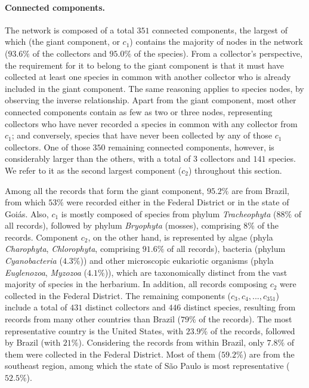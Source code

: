 \paragraph{Connected components.}
The network is composed of a total $351$ connected components, the largest of which (the giant component, or $c_1$) contains the majority of nodes in the network ($93.6\%$ of the collectors and $95.0\%$ of the species). 
From a collector's perspective, the requirement for it to belong to the giant component is that it must have collected at least one species in common with another collector who is already included in the giant component. The same reasoning applies to species nodes, by observing the inverse relationship.
Apart from the giant component, most other connected components contain as few as two or three nodes, representing collectors who have never recorded a species in common with any collector from $c_1$; and conversely, species that have never been collected by any of those $c_1$ collectors.
One of those $350$ remaining connected components, however, is considerably larger than the others, with a total of $3$ collectors and $141$ species. We refer to it as the second largest component ($c_2$) throughout this section.

Among all the records that form the giant component, $95.2\%$ are from Brazil, from which $53\%$ were recorded either in the Federal District or in the state of Goiás. 
Also, $c_1$ is mostly composed of species from phylum \textit{Tracheophyta} ($88\%$ of all records), followed by phylum \textit{Bryophyta} (mosses), comprising $8\%$ of the records. 
Component $c_2$, on the other hand, is represented by algae (phyla \textit{Charophyta}, \textit{Chlorophyta}, comprising $91.6\%$ of all records), bacteria (phylum \textit{Cyanobacteria} ($4.3\%$)) and other microscopic eukariotic organisms (phyla \textit{Euglenozoa}, \textit{Myzozoa} ($4.1\%$)), which are taxonomically distinct from the vast majority of species in the herbarium.
In addition, all records composing $c_2$ were collected in the Federal District.
The remaining components ($c_3,c_4,..., c_{351}$) include a total of $431$ distinct collectors and $446$ distinct species, resulting from records from many other countries than Brazil ($79\%$ of the records).
The most representative country is the United States, with $23.9\%$ of the records, followed by Brazil (with $21\%$). 
Considering the records from within Brazil, only $7.8\%$ of them were collected in the Federal District. Most of them ($59.2\%$) are from the southeast region, among which the state of São Paulo is most representative ($52.5\%$).

